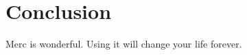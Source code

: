 
\section{Conclusion}
\label{sec:conclusion}

Merc is wonderful. Using it will change your life forever.
